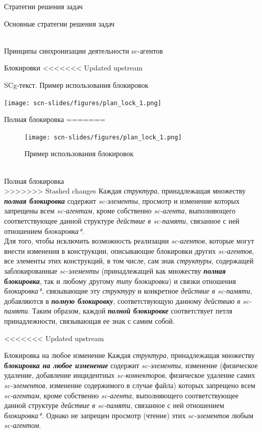 \begin{frame}{Стратегии решения задач}
\begin{frame}{\large Основные стратегии решения задач}
\begin{textitemize}
\begin{frame}{\\Принципы синхронизации деятельности sc-агентов}
\begin{frame}{Блокировки}
<<<<<<< Updated upstream
\begin{frame}{}
    \caption{SCg-текст. Пример использования блокировок}
	\texttt{[image: scn-slides/figures/plan\_lock\_1.png]}
\end{frame}

\begin{frame}{ Полная блокировка}
\vspace{12}
=======
\newpage
\begin{figure}
    \centering
    \caption{Пример использования блокировок}
	\texttt{[image: scn-slides/figures/plan\_lock\_1.png]}
\end{figure}
    


\begin{frame}{\\Полная блокировка}
\topline
\vspace{30}
 \\

>>>>>>> Stashed changes
   Каждая \textit{структура}, принадлежащая множеству \textbf{\textit{полная блокировка}} содержит \textit{sc-элементы}, просмотр и изменение которых запрещены всем \textit{sc-агентам}, кроме собственно \textit{sc-агента}, выполняющего соответствующее данной структуре \textit{действие в sc-памяти}, связанное с ней отношением \textit{блокировка*}.
\\Для того, чтобы исключить возможность реализации \textit{sc-агентов}, которые могут внести изменения в конструкции, описывающие блокировки других \textit{sc-агентов}, все элементы этих конструкций, в том числе, сам знак \textit{структуры}, содержащей заблокированные \textit{sc-элементы} (принадлежащей как множеству \textbf{\textit{полная блокировка}}, так и любому другому \textit{типу блокировки}) и связки отношения \textit{блокировка*}, связывающие эту \textit{структуру} и конкретное \textit{действие в sc-памяти}, добавляются в \textbf{\textit{полную блокировку}}, соответствующую данному \textit{действию в sc-памяти}. Таким образом, каждой \textbf{\textit{полной блокировке}} соответствует петля принадлежности, связывающая ее знак с самим собой. 
\end{frame}

<<<<<<< Updated upstream
\begin{frame}{Блокировка на любое изменение}
  Каждая \textit{структура}, принадлежащая множеству \textbf{\textit{блокировка на любое изменение}} содержит \textit{sc-элементы}, изменение (физическое удаление, добавление инцидентных \textit{sc-коннекторов}, физическое удаление самих \textit{\mbox{sc-элементов}}, изменение содержимого в случае файла) которых запрещено всем \textit{sc-агентам}, кроме собственно \textit{sc-агента}, выполняющего соответствующее данной структуре \textit{действие в sc-памяти}, связанное с ней отношением \textit{блокировка*}. Однако не запрещен просмотр (чтение) этих \textit{sc-элементов} любым \textit{sc-агентом}.  
\end{frame}


\end{frame}
\end{frame}
\end{frame}
\end{textitemize}
\end{frame}
\end{frame}
